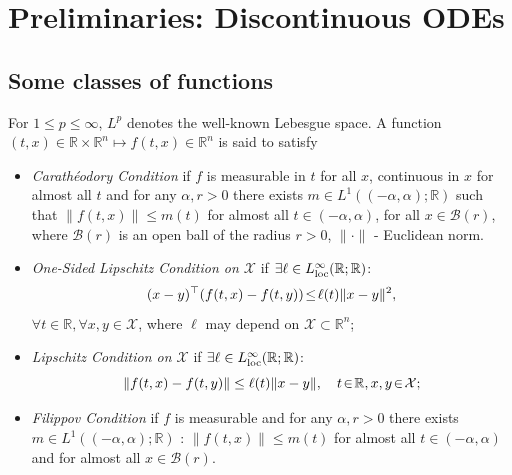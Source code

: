 \documentclass{article}
\newcommand{\R}{\mathbb{R}}
\begin{document}
\vspace{-2mm}
\section{Preliminaries: Discontinuous ODEs}\label{sec:hom}
 
 \subsection{Some classes of functions}
 	For $1\!\leq\! p\!\leq\! \infty$, $L^p$ denotes the well-known Lebesgue space.
 A function $(t,x)\in \R\times \R^n\mapsto f(t,x)\in \R^n$ is said to satisfy
 	\begin{itemize}
 	\item    \textit{Carath\'{e}odory Condition} if $f$ is
 	measurable in $t$ for all $x$, continuous in $x$ for almost all $t$ and  for any $\alpha,r>0$ there exists 
 	$m\in L^1((-\alpha,\alpha);\R)$ such that    $\left\|f(t,x)\right\| \leq m(t)$ for almost all $t\!\in\! (-\alpha,\alpha)$, for all $x\!\in\! \mathcal{B}(r)$, where $\mathcal{B}(r)$ is 
 	an open ball of the radius $r>0$, $\|\cdot\|$ - Euclidean norm.
  \item \textit{One-Sided Lipschitz Condition on $\mathcal{X}$} if
$\exists \ell\in L^{\infty}_{\rm loc}(\R;\R)$:\vspace{-1mm}
	\begin{equation}\label{eq:ch2_Lipschitz}
	(x-y)^{\top}(f(t,x)-f(t,y))\!\leq\! \ell(t)\|x-y\|^2,  \vspace{-1mm}
	\end{equation}
$\forall t\in \R, \forall x,y \!\in\! \mathcal{X}$, where 	$\ell$ may depend on $\mathcal{X}\subset \R^n$;
	  \item   \textit{Lipschitz Condition on $\mathcal{X}$} if $\exists \ell\in L^{\infty}_{\rm loc}(\R;\R)$:\vspace{-1mm}
	\begin{equation}\label{eq:ch2_Lipschitz}
		\|f(t,x)-f(t,y)\|\leq \ell(t)\|x-y\|,  \quad t\!\in\!\R,x,y \!\in\! \mathcal{X};\vspace{-1mm}
	\end{equation}	
	\item \textit{Filippov Condition} if
	$f$ is measurable and 
	for  any $\alpha,r\!>\!0$ there exists 
	$m\!\in\! L^1((-\alpha,\alpha);\R)$ :
	$\left\|f(t,x)\right\|\!\leq\!m(t)$ 
	for almost all $t\in (-\alpha,\alpha)$ and for almost all $x\in \mathcal{B}(r)$.
	\end{itemize}
\end{document}

